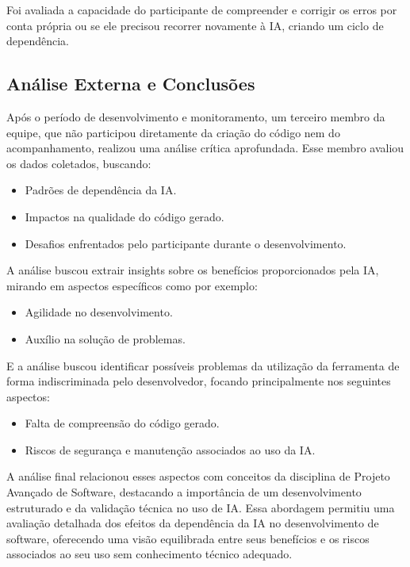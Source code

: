 \documentclass[12pt]{article}
\begin{document}
Foi avaliada a capacidade do participante de compreender e corrigir os erros por conta própria ou se ele precisou recorrer novamente à IA, criando um ciclo de dependência.

\subsection{Análise Externa e Conclusões}

Após o período de desenvolvimento e monitoramento, um terceiro membro da equipe, que não participou diretamente da criação do código nem do acompanhamento, realizou uma análise crítica aprofundada. Esse membro avaliou os dados coletados, buscando:

\begin{itemize}
    \item Padrões de dependência da IA.
    \item Impactos na qualidade do código gerado.
    \item Desafios enfrentados pelo participante durante o desenvolvimento.
\end{itemize}

A análise buscou extrair insights sobre os benefícios proporcionados pela IA, mirando em aspectos específicos como por exemplo:

\begin{itemize}
    \item Agilidade no desenvolvimento.
    \item Auxílio na solução de problemas.
\end{itemize}

E a análise buscou identificar possíveis problemas da utilização da ferramenta de forma indiscriminada pelo desenvolvedor, focando principalmente nos seguintes aspectos:

\begin{itemize}
    \item Falta de compreensão do código gerado.
    \item Riscos de segurança e manutenção associados ao uso da IA.
\end{itemize}

A análise final relacionou esses aspectos com conceitos da disciplina de Projeto Avançado de Software, destacando a importância de um desenvolvimento estruturado e da validação técnica no uso de IA. Essa abordagem permitiu uma avaliação detalhada dos efeitos da dependência da IA no desenvolvimento de software, oferecendo uma visão equilibrada entre seus benefícios e os riscos associados ao seu uso sem conhecimento técnico adequado.
\end{document}
